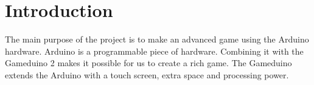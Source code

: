 \chapter{Introduction}
The main purpose of the project is to make an advanced game using the Arduino hardware.
Arduino is a programmable piece of hardware. Combining it with the  Gameduino 2 makes
it possible for us to create a rich game. The Gameduino extends the Arduino with a
touch screen, extra space and processing power.


